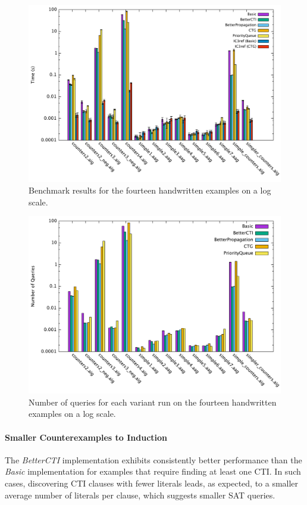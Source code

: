 \documentclass[12pt,a4paper,twoside,openright]{report}
\begin{document}
{\begin{figure}[t]
\includegraphics[width=16cm]{handwritten.pdf}
\caption{Benchmark results for the fourteen handwritten examples on a log scale.}
\end{figure}

\begin{figure}[!ht]
\includegraphics[width=16cm]{numqueries.pdf}
\caption{Number of queries for each variant run on the fourteen handwritten examples on a log scale.}
\end{figure}

\paragraph{Smaller Counterexamples to Induction}{
The \emph{BetterCTI} implementation exhibits consistently
better performance than the \emph{Basic} implementation for examples
that require finding at least one CTI. In such cases,
discovering CTI clauses with fewer literals leads, as expected, to a smaller average number of
literals per clause, which suggests smaller SAT queries.

}}
\end{document}
